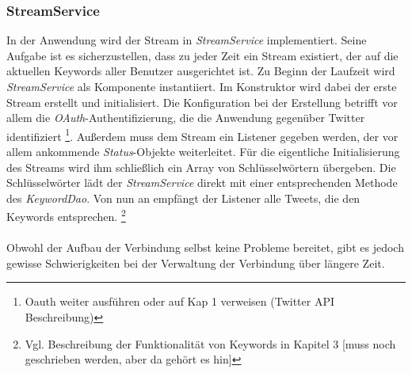 \subsubsection*{StreamService}
In der Anwendung wird der Stream in \textit{StreamService} implementiert. Seine Aufgabe ist es 
sicherzustellen, dass zu jeder Zeit ein Stream existiert, der auf die aktuellen Keywords aller 
Benutzer ausgerichtet ist. Zu Beginn der Laufzeit wird \textit{StreamService} als Komponente 
instantiiert. Im Konstruktor wird dabei der erste Stream erstellt und initialisiert. Die Konfiguration 
bei der Erstellung betrifft vor allem die \textit{OAuth}-Authentifizierung, die die Anwendung 
gegenüber Twitter identifiziert \footnote{Oauth weiter ausführen oder auf Kap 1 verweisen (Twitter API 
Beschreibung)}. Außerdem muss dem Stream ein Listener gegeben werden, der vor allem ankommende 
\textit{Status}-Objekte weiterleitet. Für die eigentliche Initialisierung des Streams wird ihm 
schließlich ein Array von Schlüsselwörtern übergeben. Die Schlüsselwörter lädt der 
\textit{StreamService} direkt mit einer entsprechenden Methode des \textit{KeywordDao}. Von nun an 
empfängt der Listener alle Tweets, die den Keywords entsprechen. \footnote{Vgl. Beschreibung der 
Funktionalität von Keywords in Kapitel 3 [muss noch geschrieben werden, aber da gehört es hin]}
\\\\
Obwohl der Aufbau der Verbindung selbst keine Probleme bereitet, gibt es jedoch gewisse Schwierigkeiten 
bei der Verwaltung der Verbindung über längere Zeit.
